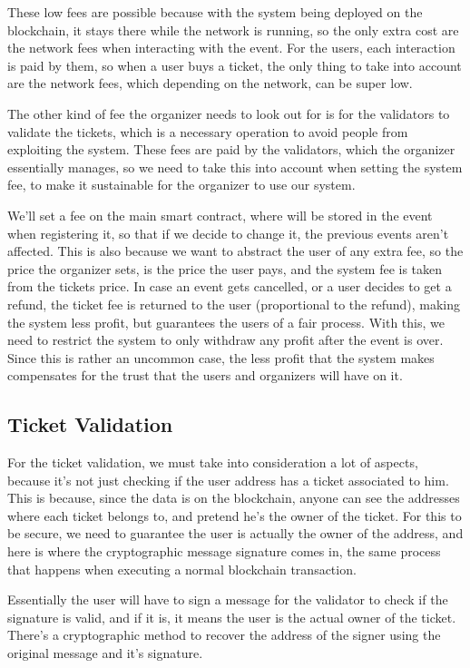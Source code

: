 These low fees are possible because with the system being deployed on the
blockchain, it stays there while the network is running, so the only extra cost
are the network fees when interacting with the event. For the users, each
interaction is paid by them, so when a user buys a ticket, the only thing to
take into account are the network fees, which depending on the network, can be
super low.

The other kind of fee the organizer needs to look out for is for the validators
to validate the tickets, which is a necessary operation to avoid people from
exploiting the system. These fees are paid by the validators, which the
organizer essentially manages, so we need to take this into account when
setting the system fee, to make it sustainable for the organizer to use our
system.

We'll set a fee on the main smart contract, where will be stored in the event
when registering it, so that if we decide to change it, the previous events
aren't affected. This is also because we want to abstract the user of any extra
fee, so the price the organizer sets, is the price the user pays, and the
system fee is taken from the tickets price. In case an event gets cancelled, or
a user decides to get a refund, the ticket fee is returned to the user
(proportional to the refund), making the system less profit, but guarantees the
users of a fair process. With this, we need to restrict the system to only
withdraw any profit after the event is over. Since this is rather an uncommon
case, the less profit that the system makes compensates for the trust that the
users and organizers will have on it.

\subsection{Ticket Validation}
\label{subsec:ticket_validation}

For the ticket validation, we must take into consideration a lot of aspects,
because it's not just checking if the user address has a ticket associated to
him. This is because, since the data is on the blockchain, anyone can see the
addresses where each ticket belongs to, and pretend he's the owner of the
ticket. For this to be secure, we need to guarantee the user is actually the
owner of the address, and here is where the cryptographic message signature
comes in, the same process that happens when executing a normal blockchain
transaction.

Essentially the user will have to sign a message for the validator to check if
the signature is valid, and if it is, it means the user is the actual owner of
the ticket. There's a cryptographic method to recover the address of the signer
using the original message and it's signature.

